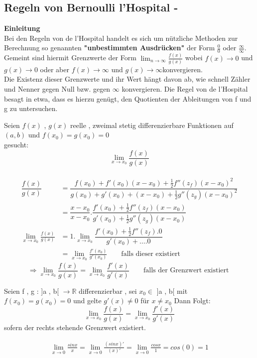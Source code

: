 \subsection{Regeln von Bernoulli l'Hospital -}
\textbf{Einleitung}\\
Bei den Regeln von de l'Hospital handelt es sich um nützliche Methoden zur Berechnung so genannten \textbf{"unbestimmten Ausdrücken"} der Form $\frac{0}{0} $ oder $\frac{\infty}{\infty} $. Gemeint sind hiermit Grenzwerte der Form $\lim_{n \to \infty}\frac{f(x)}{g(x)}$ wobei $f(x) \to 0 $ und $g(x) \to 0 $ oder aber $f(x) \to \infty $ und $g(x) \to \infty $konvergieren.\\
Die Existenz dieser Grenzwerte und ihr Wert hängt davon ab, wie schnell Zähler und Nenner gegen Null bzw. gegen $\infty$ konvergieren. Die Regel von de l'Hospital besagt in etwa, dass es hierzu genügt, den Quotienten der Ableitungen von f und g zu untersuchen.
\begin{example}
Seien $ f(x) $ , $g(x)$ reelle , zweimal stetig differenzierbare Funktionen auf $(a,b)$ und $f(x_0) = g(x_0) = 0$\\
gesucht: $$\lim_{x \to x_0}{\frac{f(x)}{g(x)}}$$\\
\begin{align*}
\dfrac{f(x)}{g(x)} &=
\dfrac{f(x_0) + f'(x_0)(x - x_0)+ \frac{1}{2}  f''(z_f)(x-x_0)^2}
{g(x_0) + g'(x_0) + (x - x_0) + \frac{1}{2}  g''(z_g)(x - x_0)^2 }\\
&= \dfrac{x - x_0}{x - x_0} . 
{ \dfrac 
{f'(x_0) + \frac{1}{2} f''(z_f )(x-x_0)}
{g'(x_0) + \frac{1}{2} g''(z_g )(x-x_0)} 
} \\
\lim\limits_{x \rightarrow x_0} \frac{f(x)}{g(x)}&=1.\lim_{x \to x_0}\dfrac{f'(x_0)+\frac{1}{2} f''(z_f).0}{g'(x_0)+\dots .0}\\
&= \lim_{x \to x_0}{\frac{f'(x_0)}{g'(x_0)}} \qquad \text{falls dieser existiert}
\end{align*}
\[\Rightarrow \lim_{x \to x_0}{\frac{f(x)}{g(x)}} =
\lim_{x \to x_0}{\frac{f'(x)}{g'(x)}}   \qquad \text{falls der Grenzwert existiert }\]
\end{example}
\begin{remark}
Seien f , g : ]a , b[ $\rightarrow \mathbb{R}$ differenzierbar , sei $x_0 \in$ ]a , b[ mit $f(x_0) = g(x_0) = 0 $ und gelte $g'(x)\neq 0 $ für $x \neq x_0$ Dann Folgt:
\[ \lim_{x \to x_0}{\dfrac{f(x)}{g(x)}} = \lim_{x \to x_0}{\dfrac{f'(x)}{g'(x)}} \]
sofern der rechts stehende Grenzwert existiert.
\end{remark}
\begin{example}
\begin{gather*}
\lim_{x \to 0}{\frac{sin x}{x}} =
 \lim_{x \to 0}{\frac{(sin x)'}{(x)'}}
= \lim_{x \to 0}{\frac{cos x}{1}} = cos(0) = 1
\end{gather*}
\end{example}
